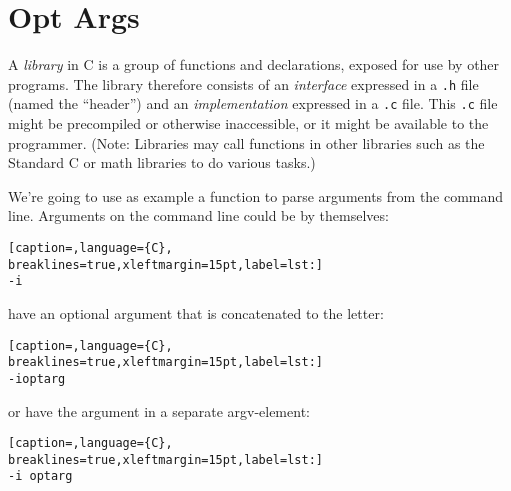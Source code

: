 \section{Opt Args}
A \emph{library} in C is a group of functions and declarations, exposed for use
by other programs. The library therefore consists of an \emph{interface}
expressed in a \texttt{.h} file (named the ``header'') and an
\emph{implementation} expressed in a \texttt{.c} file. This \texttt{.c} file
might be precompiled or otherwise inaccessible, or it might be available to the
programmer. (Note: Libraries may call functions in other libraries such as the
Standard C or math libraries to do various tasks.)

We're going to use as example a function to parse arguments from the command
line. Arguments on the command line could be by themselves:
\lstset{basicstyle=\scriptsize, numbers=left, captionpos=b, tabsize=4}
\begin{lstlisting}[caption=,language={C},
breaklines=true,xleftmargin=15pt,label=lst:]
-i
\end{lstlisting}

have an optional argument that is concatenated to the letter:
\lstset{basicstyle=\scriptsize, numbers=left, captionpos=b, tabsize=4}
\begin{lstlisting}[caption=,language={C},
breaklines=true,xleftmargin=15pt,label=lst:]
-ioptarg
\end{lstlisting}

or have the argument in a separate argv-element:
\lstset{basicstyle=\scriptsize, numbers=left, captionpos=b, tabsize=4}
\begin{lstlisting}[caption=,language={C},
breaklines=true,xleftmargin=15pt,label=lst:]
-i optarg
\end{lstlisting}

